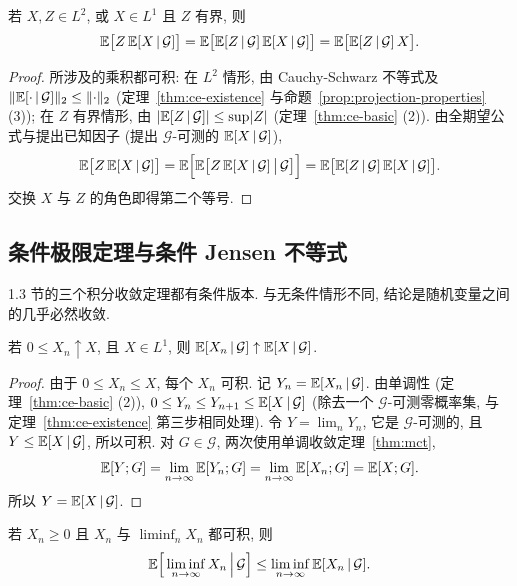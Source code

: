 \begin{corollary}[条件期望的自伴性]\label{cor:ce-selfadjoint}
若 $X,Z\in L^2$, 或 $X\in L^1$ 且 $Z$ 有界, 则
\[
\mathbb{E}\big[Z\,\mathbb{E}[X\,|\,\mathcal{G}]\big]=\mathbb{E}\big[\mathbb{E}[Z\,|\,\mathcal{G}]\,\mathbb{E}[X\,|\,\mathcal{G}]\big]=\mathbb{E}\big[\mathbb{E}[Z\,|\,\mathcal{G}]\,X\big].
\]
\end{corollary}

\begin{proof}
所涉及的乘积都可积: 在 $L^2$ 情形, 由 Cauchy-Schwarz 不等式及 $\lVert\mathbb{E}[\cdot\,|\,\mathcal{G}]\rVert_2\le\lVert\cdot\rVert_2$ (定理~\ref{thm:ce-existence} 与命题~\ref{prop:projection-properties} (3)); 在 $Z$ 有界情形, 由 $\lvert\mathbb{E}[Z\,|\,\mathcal{G}]\rvert\le\sup\lvert Z\rvert$ (定理~\ref{thm:ce-basic} (2)). 由全期望公式与提出已知因子 (提出 $\mathcal{G}$-可测的 $\mathbb{E}[X\,|\,\mathcal{G}]$),
\[
\mathbb{E}\big[Z\,\mathbb{E}[X\,|\,\mathcal{G}]\big]=\mathbb{E}\Big[\mathbb{E}\big[Z\,\mathbb{E}[X\,|\,\mathcal{G}]\,\big|\,\mathcal{G}\big]\Big]=\mathbb{E}\big[\mathbb{E}[Z\,|\,\mathcal{G}]\,\mathbb{E}[X\,|\,\mathcal{G}]\big].
\]
交换 $X$ 与 $Z$ 的角色即得第二个等号.
\end{proof}

\subsection{条件极限定理与条件 Jensen 不等式}

1.3 节的三个积分收敛定理都有条件版本. 与无条件情形不同, 结论是随机变量之间的几乎必然收敛.

\begin{theorem}[条件单调收敛定理]\label{thm:cmct}
若 $0\le X_n\uparrow X$, 且 $X\in L^1$, 则 $\mathbb{E}[X_n\,|\,\mathcal{G}]\uparrow\mathbb{E}[X\,|\,\mathcal{G}]$.
\end{theorem}

\begin{proof}
由于 $0\le X_n\le X$, 每个 $X_n$ 可积. 记 $Y_n=\mathbb{E}[X_n\,|\,\mathcal{G}]$. 由单调性 (定理~\ref{thm:ce-basic} (2)), $0\le Y_n\le Y_{n+1}\le\mathbb{E}[X\,|\,\mathcal{G}]$ (除去一个 $\mathcal{G}$-可测零概率集, 与定理~\ref{thm:ce-existence} 第三步相同处理). 令 $Y=\lim_nY_n$, 它是 $\mathcal{G}$-可测的, 且 $Y\le\mathbb{E}[X\,|\,\mathcal{G}]$, 所以可积. 对 $G\in\mathcal{G}$, 两次使用单调收敛定理~\ref{thm:mct},
\[
\mathbb{E}[Y;G]=\lim_{n\to\infty}\mathbb{E}[Y_n;G]=\lim_{n\to\infty}\mathbb{E}[X_n;G]=\mathbb{E}[X;G].
\]
所以 $Y=\mathbb{E}[X\,|\,\mathcal{G}]$.
\end{proof}

\begin{theorem}[条件 Fatou 引理]\label{thm:cfatou}
若 $X_n\ge0$ 且 $X_n$ 与 $\liminf_nX_n$ 都可积, 则
\[
\mathbb{E}\Big[\liminf_{n\to\infty}X_n\,\Big|\,\mathcal{G}\Big]\le\liminf_{n\to\infty}\mathbb{E}[X_n\,|\,\mathcal{G}].
\]
\end{theorem}

